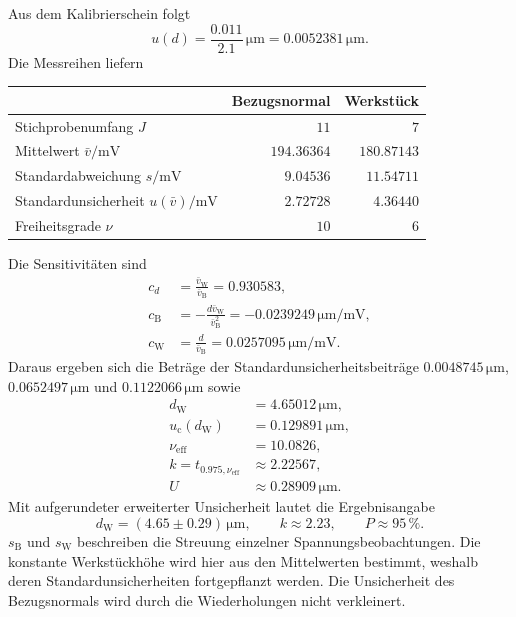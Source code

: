 Aus dem Kalibrierschein folgt
\begin{equation}
u(d)=\frac{0.011}{2.1}\,\mathrm{\mu m}
=0.0052381\,\mathrm{\mu m}.
\end{equation}
Die Messreihen liefern
\begin{center}
\small
\renewcommand{\arraystretch}{1.3}
\begin{tabular}{lrr}
 & Bezugsnormal & Werkstück\\
\hline
Stichprobenumfang $J$ & $11$ & $7$\\
Mittelwert $\bar v/\mathrm{mV}$ & $194.36364$ & $180.87143$\\
Standardabweichung $s/\mathrm{mV}$ & $9.04536$ & $11.54711$\\
Standardunsicherheit $u(\bar v)/\mathrm{mV}$ & $2.72728$ & $4.36440$\\
Freiheitsgrade $\nu$ & $10$ & $6$
\end{tabular}
\end{center}

Die Sensitivitäten sind
\begin{equation}
\begin{aligned}
c_d&=\frac{\bar v_{\mathrm W}}{\bar v_{\mathrm B}}
=0.930583,\\
c_{\mathrm B}&=-\frac{d\bar v_{\mathrm W}}{\bar v_{\mathrm B}^2}
=-0.0239249\,\mathrm{\mu m/mV},\\
c_{\mathrm W}&=\frac{d}{\bar v_{\mathrm B}}
=0.0257095\,\mathrm{\mu m/mV}.
\end{aligned}
\end{equation}
Daraus ergeben sich die Beträge der Standardunsicherheitsbeiträge
$0.0048745\,\mathrm{\mu m}$, $0.0652497\,\mathrm{\mu m}$ und
$0.1122066\,\mathrm{\mu m}$ sowie
\begin{equation}
\begin{aligned}
d_{\mathrm W}&=4.65012\,\mathrm{\mu m},\\
u_{\mathrm c}(d_{\mathrm W})&=0.129891\,\mathrm{\mu m},\\
\nu_{\mathrm{eff}}&=10.0826,\\
k=t_{0.975,\nu_{\mathrm{eff}}}&\approx2.22567,\\
U&\approx0.28909\,\mathrm{\mu m}.
\end{aligned}
\end{equation}
Mit aufgerundeter erweiterter Unsicherheit lautet die Ergebnisangabe
\begin{equation}
d_{\mathrm W}=(4.65\pm0.29)\,\mathrm{\mu m},\qquad
k\approx2.23,\qquad P\approx95\,\%.
\end{equation}
$s_{\mathrm B}$ und $s_{\mathrm W}$ beschreiben die Streuung einzelner
Spannungsbeobachtungen. Die konstante Werkstückhöhe wird hier aus den
Mittelwerten bestimmt, weshalb deren Standardunsicherheiten fortgepflanzt
werden. Die Unsicherheit des Bezugsnormals wird durch die Wiederholungen
nicht verkleinert.

